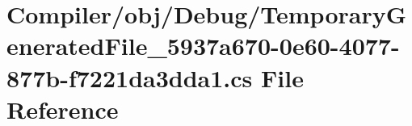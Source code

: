 \hypertarget{_compiler_2obj_2_debug_2_temporary_generated_file__5937a670-0e60-4077-877b-f7221da3dda1_8cs}{}\section{Compiler/obj/\+Debug/\+Temporary\+Generated\+File\+\_\+5937a670-\/0e60-\/4077-\/877b-\/f7221da3dda1.cs File Reference}
\label{_compiler_2obj_2_debug_2_temporary_generated_file__5937a670-0e60-4077-877b-f7221da3dda1_8cs}
